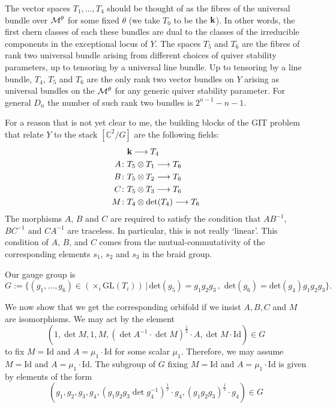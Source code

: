 \documentclass{amsart}
\theoremstyle{definition}
\begin{document}
The vector spaces $T_1, \ldots, T_4$ should be thought of as the fibres of the universal bundle over $\mathcal{M}^\theta$ for some fixed $\theta$ (we take $T_0$ to be the $\mathbf{k}$).
In other words, the first chern classes of each these bundles are dual to the classes of the irreducible components in the exceptional locus of $Y$.
The spaces $T_5$ and $T_6$ are the fibres of rank two universal bundle arising from different choices of quiver stability parameters, up to tensoring by a universal line bundle.
Up to tensoring by a line bundle, $T_4$, $T_5$ and $T_6$ are the only rank two vector bundles on $Y$ arising as universal bundles on the $\mathcal{M}^\theta$ for any generic quiver stability parameter.
For general $D_n$ the number of such rank two bundles is $2^{n-1}-n-1$.

For a reason that is not yet clear to me, the building blocks of the GIT problem that relate $Y$ to the stack $[\mathbb{C}^2/G]$ are the following fields:
\begin{align*}
&\mathbf{k} \longrightarrow T_4 \\
A \colon &T_5 \otimes T_1 \longrightarrow T_6 \\
B \colon &T_5 \otimes T_2 \longrightarrow T_6 \\
C \colon &T_5 \otimes T_3 \longrightarrow T_6 \\
M \colon &T_4 \otimes \text{det}(T_4) \longrightarrow T_6
\end{align*}
The morphisms $A$, $B$ and $C$ are required to satisfy the condition that $AB^{-1}$, $BC^{-1}$ and $CA^{-1}$ are traceless.
In particular, this is not really `linear'.
This condition of $A$, $B$, and $C$ comes from the mutual-commutativity of the corresponding elements $s_1$, $s_2$ and $s_3$ in the braid group.

Our gauge group is $$G := \{(g_1, \ldots,g_6) \in (\times_i \text{GL}(T_i)) \, |\, \text{det}(g_5)= g_1 g_2 g_3 \, , \,\, \text{det}(g_6)= \text{det}(g_4)g_1 g_2 g_3 \}.$$

We now show that we get the corresponding orbifold if we insist $A,B,C$ and $M$ are isomorphisms.
We may act by the element $$(1, \det M, 1, M, (\det A^{-1}\cdot \det M)^{\frac{1}{2}} \cdot A, \det M \cdot \text{Id}) \in G$$ to fix $M=\text{Id}$ and $A= \mu_1 \cdot \text{Id}$ for some scalar $\mu_1$. Therefore, we may assume $M = \text{Id}$ and $A = \mu_1 \cdot \text{Id}$.
The subgroup of $G$ fixing $M= \text{Id}$ and $A= \mu_1 \cdot \text{Id}$ is given by elements of the form $$(g_1, g_2, g_3, g_4, (g_1 g_2 g_3 \det g_4^{-1})^\frac{1}{2} \cdot g_4, (g_1g_2g_3)^\frac{1}{2} \cdot g_4) \in G$$
\end{document}
